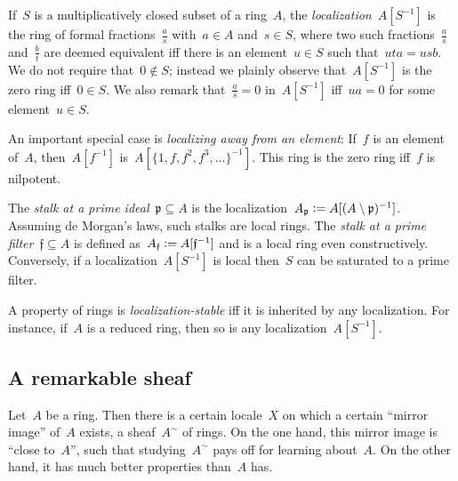 \documentclass{ws-rv9x6}
\newcommand{\ppp}{\mathfrak{p}}
\newcommand{\fff}{\mathfrak{f}}
\newcommand{\defeq}{\vcentcolon=}
\renewcommand{\_}{\mathpunct{.}}
\newcommand{\?}{\,{:}\,}
\begin{document}
If~$S$ is a multiplicatively closed subset of a ring~$A$, the
\emph{localization}~$A[S^{-1}]$ is the ring of formal fractions~$\frac{a}{s}$ with~$a
\in A$ and~$s \in S$, where two such fractions~$\frac{a}{s}$ and~$\frac{b}{t}$ are deemed
equivalent iff there is an element~$u \in S$ such that~$uta = usb$. We do not
require that~$0 \not\in S$; instead we plainly observe that~$A[S^{-1}]$ is the
zero ring iff~$0 \in S$. We also remark that~$\frac{a}{s} = 0$ in~$A[S^{-1}]$
iff~$ua = 0$ for some element~$u \in S$.

An important special case is \emph{localizing away from an element}: If~$f$ is
an element of~$A$, then~$A[f^{-1}]$ is~$A[\{1,f,f^2,f^3,\ldots\}^{-1}]$. This
ring is the zero ring iff~$f$ is nilpotent.

The \emph{stalk at a prime ideal}~$\ppp \subseteq A$ is the
localization~$A_\ppp \defeq A[(A \setminus \ppp)^{-1}]$. Assuming de Morgan's
laws, such stalks are local rings. The \emph{stalk at a prime filter}~$\fff \subseteq A$ is
defined as~$A_\fff \defeq A[\fff^{-1}]$ and is a local ring even
constructively. Conversely, if a localization~$A[S^{-1}]$ is local then~$S$ can
be saturated to a prime filter.

A property of rings is \emph{localization-stable} iff it is inherited by any
localization. For instance, if~$A$ is a reduced ring, then so is any
localization~$A[S^{-1}]$.


\subsection{A remarkable sheaf}
\label{sect:a-remarkable-sheaf}

Let~$A$ be a ring. Then there is a certain locale~$X$ on which a
certain ``mirror image'' of~$A$ exists, a sheaf~$A^\sim$ of rings. On the one hand,
this mirror image is ``close to~$A$'', such that studying~$A^\sim$ pays off for
learning about~$A$. On the other hand, it has much better properties than~$A$
has.
\end{document}
